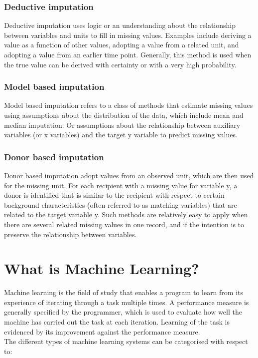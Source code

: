 \documentclass[]{book}
\begin{document}
\subsection{Deductive imputation}\label{deductive-imputation}

Deductive imputation uses logic or an understanding about the
relationship between variables and units to fill in missing values.
Examples include deriving a value as a function of other values,
adopting a value from a related unit, and adopting a value from an
earlier time point. Generally, this method is used when the true value
can be derived with certainty or with a very high probability.

\subsection{Model based imputation}\label{model-based-imputation}

Model based imputation refers to a class of methods that estimate
missing values using assumptions about the distribution of the data,
which include mean and median imputation. Or assumptions about the
relationship between auxiliary variables (or x variables) and the target
y variable to predict missing values.

\subsection{Donor based imputation}\label{donor-based-imputation}

Donor based imputation adopt values from an observed unit, which are
then used for the missing unit. For each recipient with a missing value
for variable y, a donor is identified that is similar to the recipient
with respect to certain background characteristics (often referred to as
matching variables) that are related to the target variable y. Such
methods are relatively easy to apply when there are several related
missing values in one record, and if the intention is to preserve the
relationship between variables.

\chapter{What is Machine Learning?}\label{what-is-machine-learning}

Machine learning is the field of study that enables a program to learn
from its experience of iterating through a task multiple times. A
performance measure is generally specified by the programmer, which is
used to evaluate how well the machine has carried out the task at each
iteration. Learning of the task is evidenced by its improvement against
the performance measure.\\
The different types of machine learning systems can be categorised with
respect to:
\end{document}
